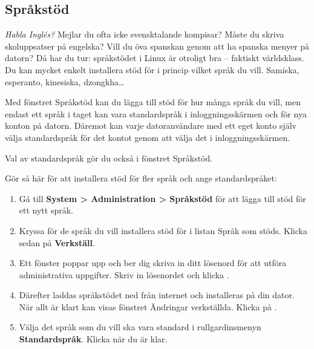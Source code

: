 \documentclass[a4paper,final]{memoir} %
\begin{document}


\subsection{Språkstöd}


\textit{Habla Inglés?} Mejlar du ofta icke svensktalande kompisar? Måste du skriva skoluppsatser på engelska? Vill du öva spanskan genom att ha spanska menyer på datorn? Då har du tur: språkstödet i Linux är otroligt bra -- faktiskt världsklass. Du kan mycket enkelt installera stöd för i princip vilket språk du vill. Samiska, esperanto, kinesiska, dzongkha\ldots{}

Med fönstret Språkstöd kan du lägga till stöd för hur många språk du vill, men endast ett språk i taget kan vara standardspråk i inloggningsskärmen och för nya konton på datorn. Däremot kan varje datoranvändare med ett eget konto själv välja standardspråk för det kontot genom att välja det i inloggningsskärmen. 

Val av standardspråk gör du också i fönstret Språkstöd.

Gör så här för att installera stöd för fler språk och ange standardspråket:

\begin{enumerate}

\item Gå till \textbf{System \textgreater{} Administration \textgreater{} Språkstöd} för att lägga till stöd för ett nytt språk.

\item  Kryssa för de språk du vill installera stöd för i listan Språk som stöds. Klicka sedan på \textbf{Verkställ}.  

\item Ett fönster poppar upp och ber dig skriva in ditt lösenord för att utföra administrativa uppgifter. Skriv in lösenordet och klicka \xok{}.

\item Därefter laddas språkstödet ned från internet och installeras på din dator. När allt är klart kan visas fönstret Ändringar verkställda. Klicka på \xstang{}. 

\item Välja det språk som du vill ska vara standard i rullgardinsmenyn \textbf{Standardspråk}. Klicka \xok{} när du är klar.

\end{enumerate}
\end{document}
